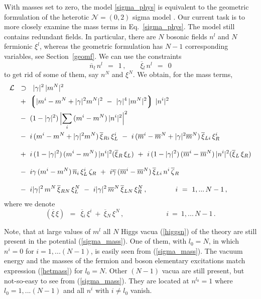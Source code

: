 \documentclass[12pt]{article}
\newcommand{\ntwoo}{${\mathcal N}= \left(0,2\right) $ }
\newcommand{\ov}{\overline}
\newcommand{\mc}[1]{\mathcal{#1}}
\newcommand{\lgr}{\left\lgroup}
\newcommand{\rgr}{\right\rgroup}
\newcommand{\bxir}{\ov{\xi}{}_R}
\newcommand{\bxil}{\ov{\xi}{}_L}
\newcommand{\xir}{\xi_R}
\newcommand{\xil}{\xi_L}
\newcommand{\bzr}{\ov{\zeta}{}_R}
\newcommand{\zr}{\zeta_R}
\begin{document}
	With masses set to zero, the model \eqref{sigma_phys} is equivalent to the 
	geometric formulation of the heterotic \ntwoo sigma model \cite{SYhet,BSYhet}.
Our current task is to more closely examine  the mass terms in Eq.~\eqref{sigma_phys}.
	The model still contains redundant fields.
	In particular, there are $N$ bosonic fields $n^l$ and $N$ fermionic $\xi^l$,
	whereas the geometric formulation has $N-1$ corresponding variables, see
	Section~\ref{geomf}.
	We can use the constraints
\[
	\ov{n}{}_l\, n^l ~~=~~ 1\,, \qquad \ov{\xi}{}_l\, n^l ~~=~~ 0
\]
	to get rid of some of them, say $ n^N $ and $ \xi^N $.
	We obtain, for the mass terms,
\begin{align}
%
\notag
	\mc{L} & ~~\supset~~ 
	|\gamma|^2\, |m^N|^2  
	\\
%
\notag
	&~
	~+~
	\lgr | m^i - m^N + |\gamma|^2 m^N |^2 ~-~ |\gamma|^4\, |m^N|^2 \rgr\, |n^i|^2 
	\\
%
\notag
	&~
	~-~ (1 - |\gamma|^2)\, \Bigl|\sum_i\, (m^i - m^N)\,|n^i|^2 \Bigr|^2
	\\
%	
\label{sigma_mass}
	&~
	~-~ i\,(m^i - m^N + |\gamma|^2 m^N )\,\ov{\xi}{}_{Ri}\,\xi_L^i
	~-~ i\,(\ov{m}{}^i - \ov{m}{}^N + |\gamma|^2\ov{m}{}^N)\, \ov{\xi}{}_{Li}\, \xi_R^i 
	\\[3mm]
%
\notag
	&~
	~+~ i\,(1-|\gamma|^2)\,(m^i - m^N)\,|n^i|^2(\bxir\,\xil) 
	~+~ i\,(1-|\gamma|^2)\,(\ov{m}{}^i - \ov{m}{}^N)\,|n^i|^2(\bxil\,\xir)
	\\[3mm]
%
\notag
	&~
	~-~ i \gamma\, (m^i - m^N)\, \ov{n}{}_i\, \xi_L^i\, \zr
	~+~ i \ov{\gamma}\, (\ov{m}{}^i - \ov{m}{}^N)\, \ov{\xi}{}_{Li}\, n^i\, \bzr
	\\[3mm]
%
\notag
	&~
	~-~ i |\gamma|^2\, m^N\, \ov{\xi}{}_{RN}\, \xi_L^N
	~-~ i |\gamma|^2\, \ov{m}^N\, \ov{\xi}{}_{LN}\, \xi_R^N\,,
	\qquad\qquad
	i ~=~ 1,...\,N-1\,,
\end{align}
	where we denote
\[
	(\ov{\xi}\, \xi) ~~=~~ \ov{\xi}{}_i\, \xi^i  ~+~  \ov{\xi}{}_N\, \xi^N\,,
	\qquad\qquad\qquad
	i ~=~ 1,...\,N-1\,.
\]

\vspace{2mm}

Note, that at large values of $m^l$ all $N$ Higgs vacua (\ref{higgsn}) of the theory  are
still present in the potential (\ref{sigma_mass}).
One of them, with $l_0=N$, in which  $n^i=0$ for {$i=1,...(N-1)$},
is easily seen from (\ref{sigma_mass}). The vacuum energy and the
masses of the fermion and boson elementary excitations match
expression (\ref{hetmass}) for $l_0=N$. Other $(N-1)$
vacua are still present, but not-so-easy to see from (\ref{sigma_mass}).
They are located at $n^{l_0}=1$ where $l_0=1,...(N-1)$ and  all $  n^i$ with $i\neq l_0$
vanish.
\end{document}
